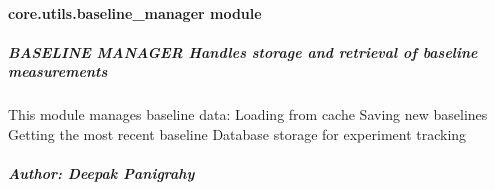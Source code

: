 \documentclass[letterpaper,10pt,english]{sphinxmanual}
\begin{document}
\paragraph{core.utils.baseline\_manager module}
\label{\detokenize{core.utils.baseline_manager:module-core.utils.baseline_manager}}\label{\detokenize{core.utils.baseline_manager:core-utils-baseline-manager-module}}\label{\detokenize{core.utils.baseline_manager::doc}}

\subparagraph{BASELINE MANAGER \textendash{} Handles storage and retrieval of baseline measurements}
\label{\detokenize{core.utils.baseline_manager:baseline-manager-handles-storage-and-retrieval-of-baseline-measurements}}
\sphinxAtStartPar
This module manages baseline data:
\sphinxhyphen{} Loading from cache
\sphinxhyphen{} Saving new baselines
\sphinxhyphen{} Getting the most recent baseline
\sphinxhyphen{} Database storage for experiment tracking


\subparagraph{Author: Deepak Panigrahy}
\label{\detokenize{core.utils.baseline_manager:author-deepak-panigrahy}}
\end{document}
